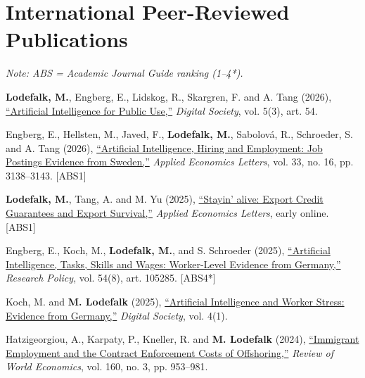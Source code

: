\documentclass[11pt,a4paper]{article}
\newcommand{\name}[1]{\textbf{#1}}
\newcommand{\publication}[1]{\item #1}
\newcommand{\absrank}[1]{\textcolor{rankgray}{\scriptsize [ABS#1]}}
\begin{document}
\section{International Peer-Reviewed Publications}

\textit{Note: ABS = Academic Journal Guide ranking (1--4*).}

\vspace{6pt}

\begin{enumerate}[label={[\arabic*]}]

\publication{\name{Lodefalk, M.}, Engberg, E., Lidskog, R., Skargren, F. and A. Tang (2026), \href{https://doi.org/10.1007/s44206-026-00285-z}{``Artificial Intelligence for Public Use,''} \textit{Digital Society}, vol. 5(3), art. 54.} %

\publication{Engberg, E., Hellsten, M., Javed, F., \name{Lodefalk, M.}, Sabolová, R., Schroeder, S. and A. Tang (2026), \href{https://doi.org/10.1080/13504851.2025.2497431}{``Artificial Intelligence, Hiring and Employment: Job Postings Evidence from Sweden,''} \textit{Applied Economics Letters}, vol. 33, no. 16, pp. 3138--3143. \absrank{1}} %

\publication{\name{Lodefalk, M.}, Tang, A. and M. Yu (2025), \href{https://doi.org/10.1080/13504851.2025.2549506}{``Stayin' alive: Export Credit Guarantees and Export Survival,''} \textit{Applied Economics Letters}, early online. \absrank{1}}

\publication{Engberg, E., Koch, M., \name{Lodefalk, M.}, and S. Schroeder (2025), \href{https://doi.org/10.1016/j.respol.2025.105285}{``Artificial Intelligence, Tasks, Skills and Wages: Worker-Level Evidence from Germany,''} \textit{Research Policy}, vol. 54(8), art. 105285. \absrank{4*}}

\publication{Koch, M. and \name{M. Lodefalk} (2025), \href{https://doi.org/10.1007/s44206-025-00160-3}{``Artificial Intelligence and Worker Stress: Evidence from Germany,''} \textit{Digital Society}, vol. 4(1).}

\publication{Hatzigeorgiou, A., Karpaty, P., Kneller, R. and \name{M. Lodefalk} (2024), \href{https://doi.org/10.1007/s10290-023-00519-z}{``Immigrant Employment and the Contract Enforcement Costs of Offshoring,''} \textit{Review of World Economics}, vol. 160, no. 3, pp. 953--981.}


\end{enumerate}
\end{document}
